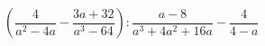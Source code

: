 \begin{ex}[type=expression]
	\begin{condition}
		\(\left( \dfrac{4}{a^2-4a}-\dfrac{3a+32}{a^3-64} \right):\dfrac{a-8}{a^3+4a^2+16a}-\dfrac{4}{4-a}\)
	\end{condition}
\end{ex}
